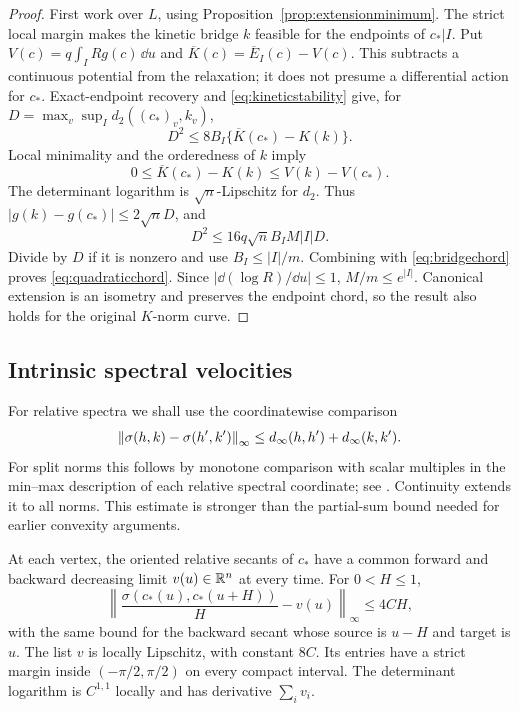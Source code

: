 \begin{proof}
First work over $L$, using Proposition~\ref{prop:extensionminimum}.
The strict local margin makes the kinetic bridge $k$ feasible for
the endpoints of $c_*|I$. Put
$V(c)=q\int_I Rg(c)\,\dd u$ and
$\overline K(c)=\overline E_I(c)-V(c)$. This subtracts a continuous
potential from the relaxation; it does not presume a differential
action for $c_*$. Exact-endpoint recovery and
\eqref{eq:kineticstability} give, for
$D=\max_v\sup_I d_2((c_*)_v,k_v)$,
\[
 D^2\le8B_I\{\overline K(c_*)-K(k)\}.
\]
Local minimality and the orderedness of $k$ imply
\[
 0\le\overline K(c_*)-K(k)\le V(k)-V(c_*).
\]
The determinant logarithm is $\sqrt n$-Lipschitz for $d_2$.
Thus $|g(k)-g(c_*)|\le2\sqrt n D$, and
\[
 D^2\le16q\sqrt n B_I M|I|D.
\]
Divide by $D$ if it is nonzero and use $B_I\le |I|/m$.
Combining with \eqref{eq:bridgechord} proves
\eqref{eq:quadraticchord}. Since $|\dd(\log R)/\dd u|\le1$,
$M/m\le e^{|I|}$. Canonical extension is an isometry and preserves
the endpoint chord, so the result also holds for the original
$K$-norm curve.
\end{proof}

\subsection{Intrinsic spectral velocities}
For relative spectra we shall use the coordinatewise comparison
\begin{equation}\label{eq:coordinatecontinuity}
 \left\lVert \sigma(h,k)-\sigma(h',k')\right\rVert_\infty
 \le d_\infty(h,h')+d_\infty(k,k').
\end{equation}
For split norms this follows by monotone comparison with scalar
multiples in the min--max description of each relative spectral
coordinate; see \cite[Lemma~2.23]{BE21}. Continuity extends it to all
norms. This estimate is stronger than the partial-sum bound needed
for earlier convexity arguments.

\begin{proposition}\label{prop:spectralvelocities}
At each vertex, the oriented relative secants of $c_*$ have a
common forward and backward decreasing limit $v(u)\in\mathbb R^n$ at
every time. For $0<H\le1$,
\begin{equation}\label{eq:secantvelocity}
 \left\|\frac{\sigma(c_*(u),c_*(u+H))}{H}-v(u)\right\|_\infty
 \le4CH,
\end{equation}
with the same bound for the backward secant whose source is $u-H$
and target is $u$. The list $v$ is locally Lipschitz, with constant
$8C$. Its entries have a strict margin inside $(-\pi/2,\pi/2)$
on every compact interval. The determinant logarithm is $C^{1,1}$
locally and has derivative $\sum_i v_i$.
\end{proposition}

